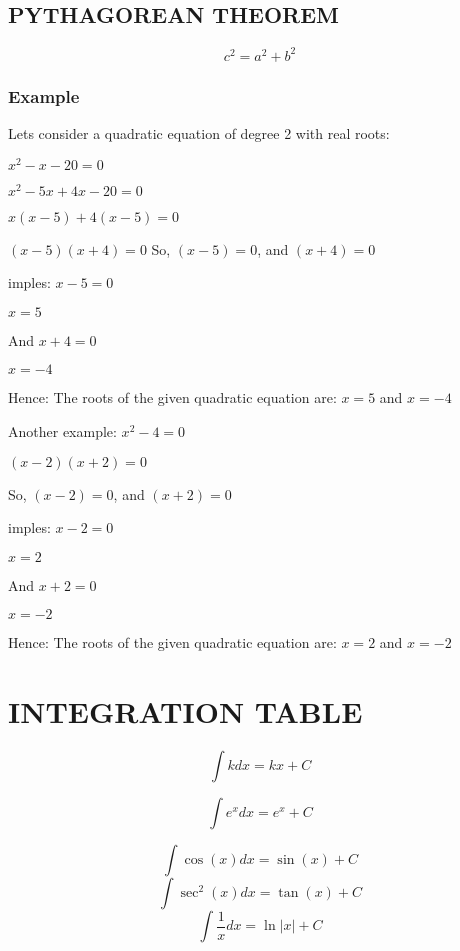 \documentclass{article}
\begin{document}
\subsection{PYTHAGOREAN THEOREM}
\[
c^2 = a^2 + b^2
\]

\subsubsection{Example}
Lets consider a quadratic equation of degree 2 with real roots:

$x^2-x-20=0$

$x^2-5x+4x-20=0$

$x(x-5)+4(x-5)=0$

$(x-5)(x+4)=0$
So, 
$(x-5) =0$, and $(x+4) =0$

imples:
$x-5 = 0$

$x = 5$

And $ x+4 = 0$

$x =-4$

Hence:
The roots of the given quadratic equation are:
$x=5$ and $ x=-4$

Another example:
$x^2-4=0$

$(x-2)(x+2)=0$

So, 
$(x-2) =0$, and $(x+2) =0$

imples:
$x-2 = 0$

$x = 2$

And $ x+2 = 0$

$x =-2$

Hence:
The roots of the given quadratic equation are:
$x=2$ and $ x=-2$

\section{INTEGRATION TABLE}

\begin{equation*}
	\int k  dx = kx + C
\end{equation*}

\begin{equation*}
	\int e^x dx = e^x + C
\end{equation*}

\begin{equation*}
	\int \cos(x) dx = \sin(x) + C
\end{equation*}
\begin{equation*}
	\int \sec^2(x) dx = \tan(x) + C
\end{equation*}
\begin{equation*}
	\int \frac{1}{x} dx = \ln |x| + C
\end{equation*}
\end{document}
